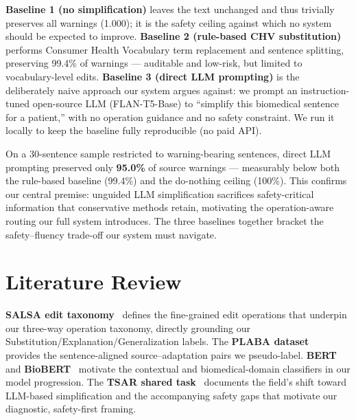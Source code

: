 \documentclass[11pt]{article}
\begin{document}
\textbf{Baseline 1 (no simplification)} leaves the text unchanged and thus
trivially preserves all warnings (1.000); it is the safety ceiling against which
no system should be expected to improve. \textbf{Baseline 2 (rule-based CHV
substitution)} performs Consumer Health Vocabulary term replacement and sentence
splitting, preserving 99.4\% of warnings --- auditable and low-risk, but limited
to vocabulary-level edits. \textbf{Baseline 3 (direct LLM prompting)} is the
deliberately naive approach our system argues against: we prompt an
instruction-tuned open-source LLM (FLAN-T5-Base) to ``simplify this biomedical
sentence for a patient,'' with no operation guidance and no safety constraint.
We run it locally to keep the baseline fully reproducible (no paid API).

On a 30-sentence sample restricted to warning-bearing sentences, direct LLM
prompting preserved only \textbf{95.0\%} of source warnings --- measurably below
both the rule-based baseline (99.4\%) and the do-nothing ceiling (100\%). This
confirms our central premise: unguided LLM simplification sacrifices
safety-critical information that conservative methods retain, motivating the
operation-aware routing our full system introduces. The three baselines together
bracket the safety--fluency trade-off our system must navigate.

\section*{Literature Review}

\textbf{SALSA edit taxonomy}~\cite{salsa} defines the fine-grained edit
operations that underpin our three-way operation taxonomy, directly grounding
our Substitution/Explanation/Generalization labels. The \textbf{PLABA
dataset}~\cite{plaba} provides the sentence-aligned source--adaptation pairs we
pseudo-label. \textbf{BERT}~\cite{bert} and \textbf{BioBERT}~\cite{biobert}
motivate the contextual and biomedical-domain classifiers in our model
progression. The \textbf{TSAR shared task}~\cite{alvamanchego2025tsarfindings} documents the field's
shift toward LLM-based simplification and the accompanying safety gaps that
motivate our diagnostic, safety-first framing.

\end{document}
